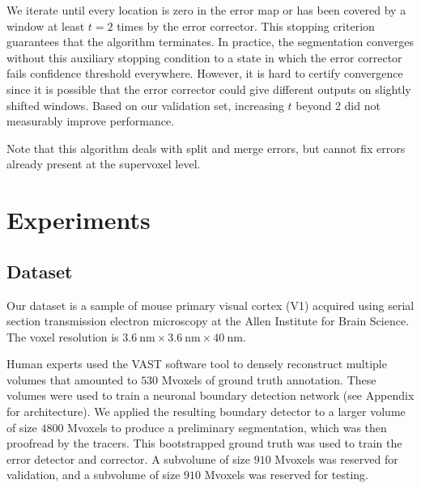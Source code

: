 \documentclass{article}
\begin{document}
We iterate until every location is zero in the error map or has been covered by a window at least $t=2$ times by the error corrector. This stopping criterion guarantees that the algorithm terminates. In practice, the segmentation converges without this auxiliary stopping condition to a state in which the error corrector fails confidence threshold everywhere. However, it is hard to certify convergence since it is possible that the error corrector could give different outputs on slightly shifted windows. Based on our validation set, increasing $t$ beyond 2 did not measurably improve performance.

Note that this algorithm deals with split and merge errors, but cannot fix errors already present at the supervoxel level.



\section{Experiments}
\subsection{Dataset}


Our dataset is a sample of mouse primary visual cortex (V1) acquired using serial section transmission electron microscopy at the Allen Institute for Brain Science. The voxel resolution is $3.6~\text{nm} \times 3.6~\text{nm} \times 40~\text{nm}$.

Human experts used the VAST software tool \cite{kasthuri2015saturated, VAST} to densely reconstruct multiple volumes that amounted to $530$ Mvoxels of ground truth annotation. These volumes were used to train a neuronal boundary detection network (see Appendix for architecture). We applied the resulting boundary detector to a larger volume of size $4800$ Mvoxels to produce a preliminary segmentation, which was then proofread by the tracers. This bootstrapped ground truth was used to train the error detector and corrector. A subvolume of size $910$ Mvoxels was reserved for validation, and a subvolume of size $910$ Mvoxels was reserved for testing.
\end{document}
